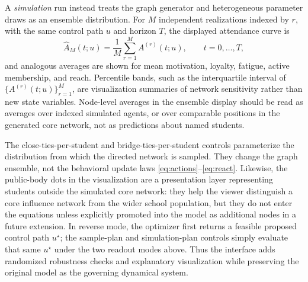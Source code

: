 \documentclass[11pt]{article}
\begin{document}
A \emph{simulation} run instead treats the graph generator and heterogeneous parameter draws as an ensemble distribution. For $M$ independent realizations indexed by $r$, with the same control path $u$ and horizon $T$, the displayed attendance curve is
\begin{equation}
  \widehat A_M(t;u)=\frac{1}{M}\sum_{r=1}^{M} A^{(r)}(t;u),
  \qquad t=0,\dots,T,
  \label{eq:ensembleA}
\end{equation}
and analogous averages are shown for mean motivation, loyalty, fatigue, active membership, and reach. Percentile bands, such as the interquartile interval of $\{A^{(r)}(t;u)\}_{r=1}^M$, are visualization summaries of network sensitivity rather than new state variables. Node-level averages in the ensemble display should be read as averages over indexed simulated agents, or over comparable positions in the generated core network, not as predictions about named students.

The close-ties-per-student and bridge-ties-per-student controls parameterize the distribution from which the directed network is sampled. They change the graph ensemble, not the behavioral update laws \eqref{eq:actions}--\eqref{eq:react}. Likewise, the public-body dots in the visualization are a presentation layer representing students outside the simulated core network: they help the viewer distinguish a core influence network from the wider school population, but they do not enter the equations unless explicitly promoted into the model as additional nodes in a future extension. In reverse mode, the optimizer first returns a feasible proposed control path $u^\star$; the sample-plan and simulation-plan controls simply evaluate that same $u^\star$ under the two readout modes above. Thus the interface adds randomized robustness checks and explanatory visualization while preserving the original model as the governing dynamical system.

\end{document}
